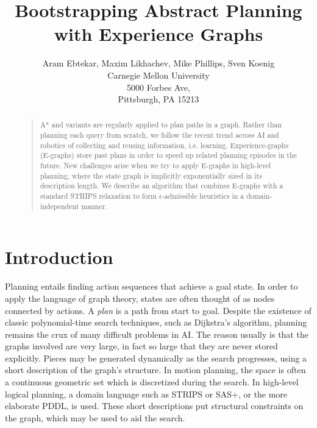 \documentclass[letterpaper]{article}
\begin{document}
%
\title{Bootstrapping Abstract Planning with Experience Graphs}
\author{Aram Ebtekar, Maxim Likhachev, Mike Phillips, Sven Koenig\\
Carnegie Mellon University\\
5000 Forbes Ave,\\
Pittsburgh, PA 15213\\
}
\maketitle
\begin{abstract}
\begin{quote}
A* and variants are regularly applied to plan paths in a graph. Rather than planning each query from scratch, we follow the recent trend across AI and robotics of collecting and reusing information, i.e. learning. Experience-graphs (E-graphs) store past plans in order to speed up related planning episodes in the future. New challenges arise when we try to apply E-graphs in high-level planning, where the state graph is implicitly exponentially sized in its description length. We describe an algorithm that combines E-graphs with a standard STRIPS relaxation to form $\epsilon$-admissible heuristics in a domain-independent manner.
\end{quote}
\end{abstract}

\section{Introduction}
Planning entails finding action sequences that achieve a goal state. In order to apply the language of graph theory, states are often thought of as nodes connected by actions. A \textit{plan} is a path from start to goal. Despite the existence of classic polynomial-time search techniques, such as Dijkstra's algorithm, planning remains the crux of many difficult problems in AI. The reason usually is that the graphs involved are very large, in fact so large that they are never stored explicitly. Pieces may be generated dynamically as the search progresses, using a short description of the graph's structure. In motion planning, the space is often a continuous geometric set which is discretized during the search. In high-level logical planning, a domain language such as STRIPS or SAS+, or the more elaborate PDDL, is used. These short descriptions put structural constraints on the graph, which may be used to aid the search.
\end{document}
